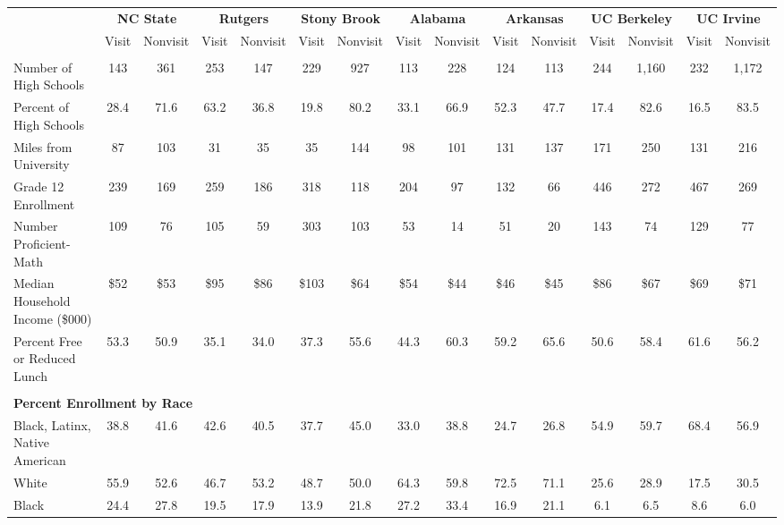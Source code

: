 \begin{tabular*}{\linewidth}{@{\extracolsep{\fill} } lcccccccccccccc}%
&\multicolumn{2}{c}{\bfseries NC State}&\multicolumn{2}{c}{\bfseries Rutgers}&\multicolumn{2}{c}{\bfseries Stony Brook}&\multicolumn{2}{c}{\bfseries Alabama}&\multicolumn{2}{c}{\bfseries Arkansas}&\multicolumn{2}{c}{\bfseries UC Berkeley}&\multicolumn{2}{c}{\bfseries UC Irvine}\\%
&Visit&\multicolumn{1}{l}{Nonvisit}&Visit&\multicolumn{1}{l}{Nonvisit}&Visit&\multicolumn{1}{l}{Nonvisit}&Visit&\multicolumn{1}{l}{Nonvisit}&Visit&\multicolumn{1}{l}{Nonvisit}&Visit&\multicolumn{1}{l}{Nonvisit}&Visit&\multicolumn{1}{l}{Nonvisit}\\%
\hline%
&&&&&&&&&&&&&&\\%
\hspace{0cm}Number of High Schools&143&361&253&147&229&927&113&228&124&113&244&1,160&232&1,172\\%
Percent of High Schools&28.4&71.6&63.2&36.8&19.8&80.2&33.1&66.9&52.3&47.7&17.4&82.6&16.5&83.5\\%
\hspace{0cm}Miles from University&87&103&31&35&35&144&98&101&131&137&171&250&131&216\\%
\hspace{0cm}Grade 12 Enrollment&239&169&259&186&318&118&204&97&132&66&446&272&467&269\\%
\hspace{0cm}Number Proficient{-}Math&109&76&105&59&303&103&53&14&51&20&143&74&129&77\\%
\hspace{0cm}Median Household Income (\$000)&\$52&\$53&\$95&\$86&\$103&\$64&\$54&\$44&\$46&\$45&\$86&\$67&\$69&\$71\\%
\hspace{0cm}Percent Free or Reduced Lunch&53.3&50.9&35.1&34.0&37.3&55.6&44.3&60.3&59.2&65.6&50.6&58.4&61.6&56.2\\%
&&&&&&&&&&&&&&\\%
\multicolumn{15}{l}{\bfseries Percent Enrollment by Race}\\%
\hspace{0.2cm}Black, Latinx, Native American&38.8&41.6&42.6&40.5&37.7&45.0&33.0&38.8&24.7&26.8&54.9&59.7&68.4&56.9\\%
\hspace{0.2cm}White&55.9&52.6&46.7&53.2&48.7&50.0&64.3&59.8&72.5&71.1&25.6&28.9&17.5&30.5\\%
\hspace{0.2cm}Black&24.4&27.8&19.5&17.9&13.9&21.8&27.2&33.4&16.9&21.1&6.1&6.5&8.6&6.0\\%

\end{tabular*}
